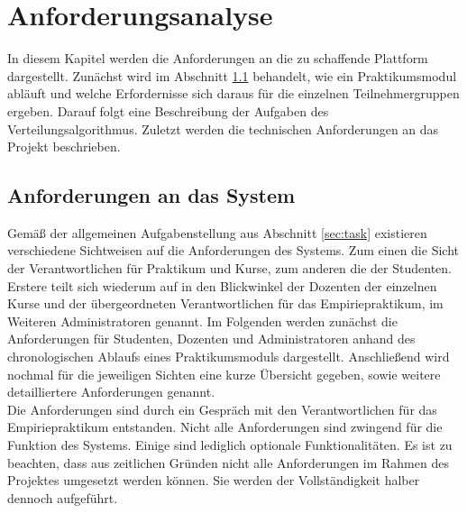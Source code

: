 \chapter{Anforderungsanalyse}
\label{chapter:requirements}    

    In diesem Kapitel werden die Anforderungen an die zu schaffende Plattform dargestellt.
    Zunächst wird im Abschnitt \ref{sec:systemrequirements} behandelt, wie ein Praktikumsmodul abläuft und welche Erfordernisse sich daraus für die einzelnen Teilnehmergruppen ergeben.
    Darauf folgt eine Beschreibung der Aufgaben des Verteilungsalgorithmus.
    Zuletzt werden die technischen Anforderungen an das Projekt beschrieben.
    
    \section{Anforderungen an das System}
    \label{sec:systemrequirements}
        Gemäß der allgemeinen Aufgabenstellung aus Abschnitt \ref{sec:task} existieren verschiedene Sichtweisen auf die Anforderungen des Systems.
        Zum einen die Sicht der Verantwortlichen für Praktikum und Kurse, zum anderen die der Studenten.
        Erstere teilt sich wiederum auf in den Blickwinkel der Dozenten der einzelnen Kurse und der übergeordneten Verantwortlichen für das Empiriepraktikum, im Weiteren Administratoren genannt.
        Im Folgenden werden zunächst die Anforderungen für Studenten, Dozenten und Administratoren anhand des chronologischen Ablaufs eines Praktikumsmoduls dargestellt.
        Anschließend wird nochmal für die jeweiligen Sichten eine kurze Übersicht gegeben, sowie weitere detailliertere Anforderungen genannt.\\
        
        Die Anforderungen sind durch ein Gespräch mit den Verantwortlichen für das Empiriepraktikum entstanden. 
        Nicht alle Anforderungen sind zwingend für die Funktion des Systems.
        Einige sind lediglich optionale Funktionalitäten.
        Es ist zu beachten, dass aus zeitlichen Gründen nicht alle Anforderungen im Rahmen des Projektes umgesetzt werden können.
        Sie werden der Vollständigkeit halber dennoch aufgeführt.
        
